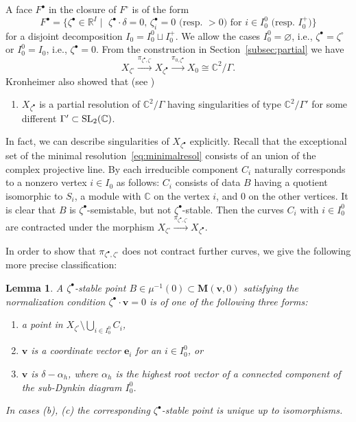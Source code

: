\documentclass[10pt,a4paper]{amsart}
\newenvironment{aenume}{%
  \begin{enumerate}%
  \renewcommand{\theenumi}{\alph{enumi}}%
  \renewcommand{\labelenumi}{\textup{(\theenumi)}}%
  }{\end{enumerate}}
\newtheorem{Lemma}[equation]{Lemma}
\theoremstyle{definition}
\numberwithin{equation}{section}
\newcommand{\subsecref}[1]{Section~\ref{#1}}
\newcommand{\C}{{\mathbb C}}
\newcommand{\R}{{\mathbb R}}
\newcommand{\SL}{\operatorname{\rm SL}}
\newcommand{\bM}{{\mathbf M}} %
\newcommand{\bv}{{\mathbf v}} %
\newcommand{\be}{{\mathbf e}}
\begin{document}
A face $F^\bullet$ in the closure of $F^\circ$ is of the form
\begin{equation*}
    F^\bullet = \{ \zeta^\bullet\in \R^I \mid \text{
     $\zeta^\bullet\cdot \delta = 0$,
     $\zeta^\bullet_i = 0$ (resp.\ $> 0$) for
    $i \in I_0^0$ (resp.\ $I_0^+$)}\}
\end{equation*}
for a disjoint decomposition $I_0 = I_0^0 \sqcup I_0^+$.
%
We allow the cases $I_0^0 = \varnothing$, i.e., $\zeta^\bullet =
\zeta^\circ$ or $I_0^0=I_0$, i.e., $\zeta^\bullet = 0$.
%
From the construction in \subsecref{subsec:partial} we have
\begin{equation*}
  X_{\zeta^\circ} \xrightarrow{\pi_{\zeta^\bullet,\zeta^\circ}}
  X_{\zeta^\bullet}\xrightarrow{\pi_{0,\zeta^\bullet}}
  X_0 \cong \C^2/\Gamma.
\end{equation*}
Kronheimer also showed that (see \cite[Lemma~3.3]{Kr})
\begin{aenume}\itemsep=0pt
\setcounter{enumi}{2}
\item $X_{\zeta^\bullet}$ is a partial resolution of $\C^2/\Gamma$
  having singularities of type $\C^2/\Gamma'$ for some dif\/ferent
  $\Gamma'\subset\SL_2(\C)$.
\end{aenume}

In fact, we can describe singularities of $X_{\zeta^\bullet}$
explicitly. Recall that the exceptional set of the minimal resolution~\eqref{eq:minimalresol} consists of an union of the complex projective
line. By \cite{Na-proc} each irreducible component $C_i$ naturally
corresponds to a nonzero vertex $i\in I_0$ as follows: $C_i$ consists
of data $B$ having a quotient isomorphic to $S_i$, a module with $\C$
on the vertex $i$, and $0$ on the other vertices.
%
It is clear that $B$ is $\zeta^\bullet$-semistable, but not
$\zeta^\bullet$-stable.
%
Then the curves $C_i$ with $i\in I_0^0$ are contracted under the
morphism
\(
   X_{\zeta^\circ}
   \xrightarrow{\pi_{\zeta^\bullet,\zeta^\circ}} X_{\zeta^\bullet}.
\)

In order to show that $\pi_{\zeta^\bullet,\zeta^\circ}$ does not
contract further curves, we give the following more precise
classif\/ication:

\begin{Lemma}\label{lem:bulletstable}
  A $\zeta^\bullet$-stable point $B\in\mu^{-1}(0)\subset\bM(\bv,0)$
  satisfying the normalization condition $\zeta^\bullet\cdot\bv = 0$
  is of one of the following three forms\textup:
  \begin{aenume}\itemsep=0pt
  \item a point in $X_{\zeta^\circ}\setminus \bigcup_{i\in I_0^0}
    C_i$,
  \item $\bv$ is a coordinate vector $\be_i$ for an $i\in
    I_0^0$, or
  \item $\bv$ is $\delta - \alpha_h$, where $\alpha_h$ is the highest
    root vector of a connected component of the sub-Dynkin diagram
    $I_0^0$.
  \end{aenume}
  In cases \textup{(b)}, \textup{(c)} the corresponding
  $\zeta^\bullet$-stable point is unique up to isomorphisms.
\end{Lemma}
\end{document}
